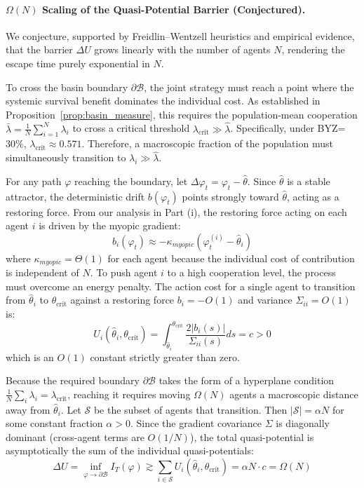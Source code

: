 \paragraph{$\Omega(N)$ Scaling of the Quasi-Potential Barrier (Conjectured).}
We conjecture, supported by Freidlin--Wentzell heuristics and empirical evidence, that the barrier $\Delta U$ grows linearly with the number of agents $N$, rendering the escape time purely exponential in $N$.

To cross the basin boundary $\partial \mathcal{B}$, the joint strategy must reach a point where the systemic survival benefit dominates the individual cost.
As established in Proposition~\ref{prop:basin_measure}, this requires the population-mean cooperation $\bar{\lambda} = \frac{1}{N} \sum_{i=1}^N \lambda_i$ to cross a critical threshold $\lambda_{\mathrm{crit}} \gg \hat{\lambda}$. Specifically, under BYZ=$30\%$, $\lambda_{\mathrm{crit}} \approx 0.571$.
Therefore, a macroscopic fraction of the population must simultaneously transition to $\lambda_i \gg \hat{\lambda}$.

For any path $\varphi$ reaching the boundary, let $\Delta \varphi_t = \varphi_t - \hat{\theta}$. Since $\hat{\theta}$ is a stable attractor, the deterministic drift $b(\varphi_t)$ points strongly toward $\hat{\theta}$, acting as a restoring force. From our analysis in Part (i), the restoring force acting on each agent $i$ is driven by the myopic gradient:
\begin{equation}
b_i(\varphi_t) \approx - \kappa_{myopic} (\varphi_t^{(i)} - \hat{\theta}_i)
\end{equation}
where $\kappa_{myopic} = \Theta(1)$ for each agent because the individual cost of contribution is independent of $N$.
To push agent $i$ to a high cooperation level, the process must overcome an energy penalty. The action cost for a single agent to transition from $\hat{\theta}_i$ to $\theta_{\mathrm{crit}}$ against a restoring force $b_i = -O(1)$ and variance $\Sigma_{ii} = O(1)$ is:
\begin{equation}
U_i(\hat{\theta}_i, \theta_{\mathrm{crit}}) = \int_{\hat{\theta}_i}^{\theta_{\mathrm{crit}}} \frac{2|b_i(s)|}{\Sigma_{ii}(s)} ds = c > 0
\end{equation}
which is an $O(1)$ constant strictly greater than zero.

Because the required boundary $\partial \mathcal{B}$ takes the form of a hyperplane condition $\frac{1}{N}\sum_i \lambda_i = \lambda_{\mathrm{crit}}$, reaching it requires moving $\Omega(N)$ agents a macroscopic distance away from $\hat{\theta}_i$. Let $\mathcal{S}$ be the subset of agents that transition. Then $|\mathcal{S}| = \alpha N$ for some constant fraction $\alpha > 0$.
Since the gradient covariance $\Sigma$ is diagonally dominant (cross-agent terms are $O(1/N)$), the total quasi-potential is asymptotically the sum of the individual quasi-potentials:
\begin{equation}
\Delta U = \inf_{\varphi \to \partial \mathcal{B}} I_T(\varphi) \gtrsim \sum_{i \in \mathcal{S}} U_i(\hat{\theta}_i, \theta_{\mathrm{crit}}) = \alpha N \cdot c = \Omega(N)
\label{eq:barrier_scaling}
\end{equation}

